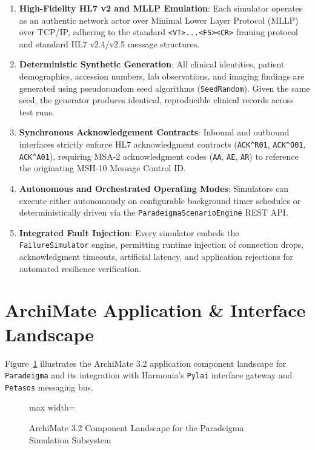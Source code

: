 \begin{enumerate}
    \item \textbf{High-Fidelity HL7 v2 and MLLP Emulation}: Each simulator operates as an authentic network actor over Minimal Lower Layer Protocol (MLLP) over TCP/IP, adhering to the standard \texttt{<VT>...<FS><CR>} framing protocol and standard HL7 v2.4/v2.5 message structures.
    \item \textbf{Deterministic Synthetic Generation}: All clinical identities, patient demographics, accession numbers, lab observations, and imaging findings are generated using pseudorandom seed algorithms (\texttt{SeedRandom}). Given the same seed, the generator produces identical, reproducible clinical records across test runs.
    \item \textbf{Synchronous Acknowledgement Contracts}: Inbound and outbound interfaces strictly enforce HL7 acknowledgment contracts (\texttt{ACK\^{}R01}, \texttt{ACK\^{}O01}, \texttt{ACK\^{}A01}), requiring MSA-2 acknowledgment codes (\texttt{AA}, \texttt{AE}, \texttt{AR}) to reference the originating MSH-10 Message Control ID.
    \item \textbf{Autonomous and Orchestrated Operating Modes}: Simulators can execute either autonomously on configurable background timer schedules or deterministically driven via the \texttt{ParadeigmaScenarioEngine} REST API.
    \item \textbf{Integrated Fault Injection}: Every simulator embeds the \texttt{FailureSimulator} engine, permitting runtime injection of connection drops, acknowledgment timeouts, artificial latency, and application rejections for automated resilience verification.
\end{enumerate}

\section{ArchiMate Application \& Interface Landscape}
\label{sec:paradeigma_landscape}

Figure~\ref{fig:paradeigma_architecture} illustrates the ArchiMate 3.2 application component landscape for \texttt{Paradeigma} and its integration with Harmonia's \texttt{Pylai} interface gateway and \texttt{Petasos} messaging bus.

\begin{figure}[htbp]
    \centering
    \begin{adjustbox}{max width=\textwidth}
        
    \end{adjustbox}
    \caption{ArchiMate 3.2 Component Landscape for the Paradeigma Simulation Subsystem}
    \label{fig:paradeigma_architecture}
\end{figure}


